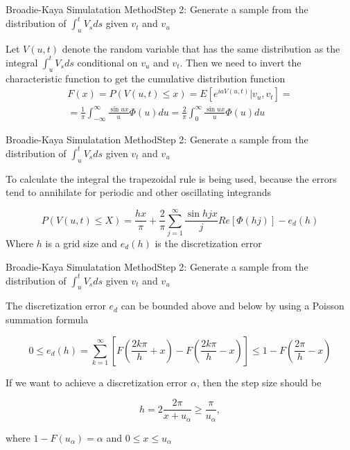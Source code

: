 \begin{frame}{Broadie-Kaya Simulatation Method}{Step 2:  Generate a sample from the distribution of $\int_{u}^t V_s ds$ given $v_t$ and $v_u$}
    
    Let $V(u,t)$  denote the random
    variable that has the same distribution as the integral $\int_{u}^t V_s ds$ conditional on $v_u$ and $v_t$.    
    Then we need to invert the characteristic function to get the cumulative distribution function
    \begin{multline}
        F(x) = P(V(u, t) \leq x) = E\left[ e^{iaV(u,t)} \Big| v_u, v_t\right] =\\= \frac{1}{\pi} \int_{-\infty}^\infty \frac{\sin ux}{u} \Phi(u) du 
        = \frac{2}{\pi} \int_{0}^\infty \frac{\sin ux}{u} \Phi(u) du
    \end{multline}
    
    
\end{frame}

\begin{frame}{Broadie-Kaya Simulatation Method}{Step 2:  Generate a sample from the distribution of $\int_{u}^t V_s ds$ given $v_t$ and $v_u$}

    To calculate the integral the trapezoidal rule is being used, because the errors tend to annihilate for periodic and other oscillating integrands

    \begin{equation}
        P(V(u, t) \leq X) = \frac{hx}{\pi} + \frac{2}{\pi} \sum_{j=1}^\infty \frac{\sin hjx}{j} Re[\Phi(hj)] - e_d(h)
    \end{equation}
    Where $h$ is a grid size and $e_d(h)$ is the discretization   error

\end{frame}

\begin{frame}{Broadie-Kaya Simulatation Method}{Step 2:  Generate a sample from the distribution of $\int_{u}^t V_s ds$ given $v_t$ and $v_u$}

    The discretization error $e_d$ can be bounded above and
below by using a Poisson summation formula 

    \begin{equation}
        0 \leq e_d(h) = \sum_{k=1}^\infty\left[ F\left(\frac{2k\pi}{h} + x\right) - F\left(\frac{2k\pi}{h} - x\right)\right] \leq 1 - F\left(\frac{2\pi}{h} - x\right)
    \end{equation}

    If we want to achieve a discretization error $\alpha$, then the
    step size should be

    \begin{equation}
        h = 2\frac{2\pi}{x+ u_\alpha} \geq \frac{\pi}{u_\alpha},
    \end{equation}

    where $1-F(u_\alpha) = \alpha$ and $0 \leq x \leq u_\alpha$


\end{frame}



